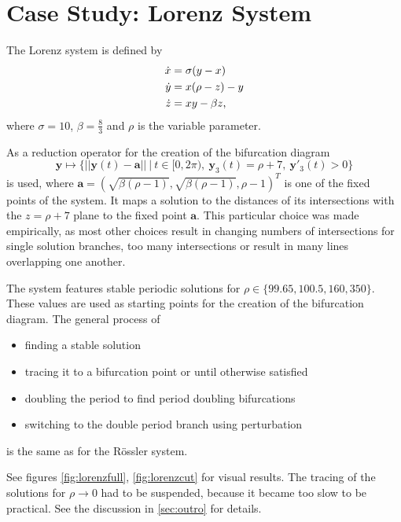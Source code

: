 \section{Case Study: Lorenz System}

The Lorenz system is defined by
\begin{align*}
	\dot x &= \sigma (y-x)\\
	\dot y &= x(\rho-z)-y\\
	\dot z &= xy-\beta z \text,
\end{align*}
where $\sigma = 10$, $\beta = \frac 8 3$ and $\rho$ is the variable parameter.

As a reduction operator for the creation of the bifurcation diagram
\[
	\mathbf y \mapsto \{||\mathbf y(t) - \mathbf a||\ |\ t \in [0,2\pi),\ \mathbf y_3(t) = \rho + 7, \ \mathbf y'_3(t) > 0\}
\]
is used, where $\mathbf a = (\sqrt{\beta(\rho-1)}, \sqrt{\beta(\rho-1)}, \rho-1)^T$ is one of the fixed points of the system.
It maps a solution to the distances of its intersections with the $z = \rho+7$ plane to the fixed point $\mathbf a$.
This particular choice was made empirically, as most other choices result in changing numbers of intersections for single solution branches, too many intersections or result in many lines overlapping one another.

The system features stable periodic solutions for $\rho \in \{99.65, 100.5, 160, 350\}$.
These values are used as starting points for the creation of the bifurcation diagram.
The general process of
\begin{itemize}
	\item finding a stable solution
	\item tracing it to a bifurcation point or until otherwise satisfied
	\item doubling the period to find period doubling bifurcations
	\item switching to the double period branch using perturbation
\end{itemize}
is the same as for the Rössler system.

See figures \ref{fig:lorenzfull}, \ref{fig:lorenzcut} for visual results.
The tracing of the solutions for $\rho \to 0$ had to be suspended, because it became too slow to be practical.
See the discussion in \autoref{sec:outro} for details.


